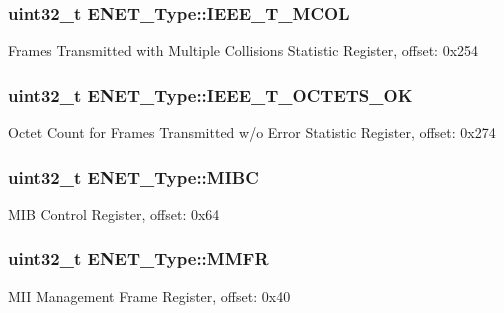 \subsubsection[{\texorpdfstring{I\+E\+E\+E\+\_\+\+T\+\_\+\+M\+C\+OL}{IEEE_T_MCOL}}]{ uint32\+\_\+t E\+N\+E\+T\+\_\+\+Type\+::\+I\+E\+E\+E\+\_\+\+T\+\_\+\+M\+C\+OL}\hypertarget{structENET__Type_ad2b7d941efa9d77ea45d685002071f29}{}\label{structENET__Type_ad2b7d941efa9d77ea45d685002071f29}
Frames Transmitted with Multiple Collisions Statistic Register, offset\+: 0x254 
\subsubsection[{\texorpdfstring{I\+E\+E\+E\+\_\+\+T\+\_\+\+O\+C\+T\+E\+T\+S\+\_\+\+OK}{IEEE_T_OCTETS_OK}}]{ uint32\+\_\+t E\+N\+E\+T\+\_\+\+Type\+::\+I\+E\+E\+E\+\_\+\+T\+\_\+\+O\+C\+T\+E\+T\+S\+\_\+\+OK}\hypertarget{structENET__Type_a68650a3ad5621a93a624ebb033347707}{}\label{structENET__Type_a68650a3ad5621a93a624ebb033347707}
Octet Count for Frames Transmitted w/o Error Statistic Register, offset\+: 0x274 
\subsubsection[{\texorpdfstring{M\+I\+BC}{MIBC}}]{ uint32\+\_\+t E\+N\+E\+T\+\_\+\+Type\+::\+M\+I\+BC}\hypertarget{structENET__Type_a75b6139ebf953cda87a5fe377df75307}{}\label{structENET__Type_a75b6139ebf953cda87a5fe377df75307}
M\+IB Control Register, offset\+: 0x64 
\subsubsection[{\texorpdfstring{M\+M\+FR}{MMFR}}]{ uint32\+\_\+t E\+N\+E\+T\+\_\+\+Type\+::\+M\+M\+FR}\hypertarget{structENET__Type_a359c03ae606c4e68658d852e5c4e5e4d}{}\label{structENET__Type_a359c03ae606c4e68658d852e5c4e5e4d}
M\+II Management Frame Register, offset\+: 0x40 
